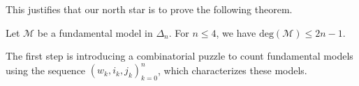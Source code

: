 This justifies that our north star is to prove the following theorem.

\begin{theorem}\label{thm:degree-fundamental-models-fundamental}
    Let \( \mathcal{M} \) be a fundamental model in \( \Delta_n \). For \(n \leq 4 \), we have \( \mathrm{deg}(\mathcal{M}) \leq 2n - 1\).
\end{theorem}

The first step is introducing a combinatorial puzzle to count fundamental models using the sequence \((w_k, i_k, j_k)_{k=0}^{n}\), which characterizes these models. 